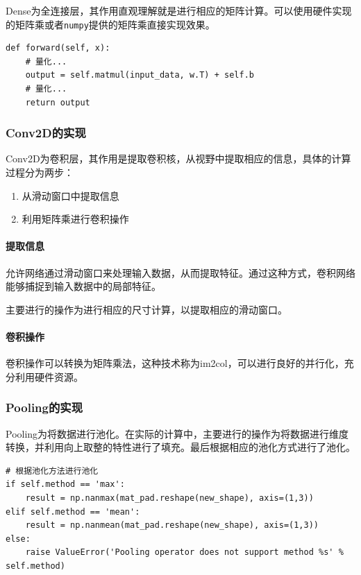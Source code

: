 \documentclass[12pt,a4paper]{article}
\begin{document}
Dense为全连接层，其作用直观理解就是进行相应的矩阵计算。可以使用硬件实现的矩阵乘或者\texttt{numpy}提供的矩阵乘直接实现效果。

\begin{lstlisting}
def forward(self, x):
    # 量化...
    output = self.matmul(input_data, w.T) + self.b
    # 量化...
    return output
\end{lstlisting}

\subsubsection{Conv2D的实现}

Conv2D为卷积层，其作用是提取卷积核，从视野中提取相应的信息，具体的计算过程分为两步：

\begin{enumerate}
\def\labelenumi{\arabic{enumi}.}
\item
  从滑动窗口中提取信息
\item
  利用矩阵乘进行卷积操作
\end{enumerate}

\paragraph{提取信息}

允许网络通过滑动窗口来处理输入数据，从而提取特征。通过这种方式，卷积网络能够捕捉到输入数据中的局部特征。

主要进行的操作为进行相应的尺寸计算，以提取相应的滑动窗口。

\paragraph{卷积操作}

卷积操作可以转换为矩阵乘法，这种技术称为im2col，可以进行良好的并行化，充分利用硬件资源。

\subsubsection{Pooling的实现}

Pooling为将数据进行池化。在实际的计算中，主要进行的操作为将数据进行维度转换，并利用向上取整的特性进行了填充。最后根据相应的池化方式进行了池化。

\begin{lstlisting}
# 根据池化方法进行池化
if self.method == 'max':
    result = np.nanmax(mat_pad.reshape(new_shape), axis=(1,3))
elif self.method == 'mean':
    result = np.nanmean(mat_pad.reshape(new_shape), axis=(1,3))
else:
    raise ValueError('Pooling operator does not support method %s' % self.method)
\end{lstlisting}
\end{document}
